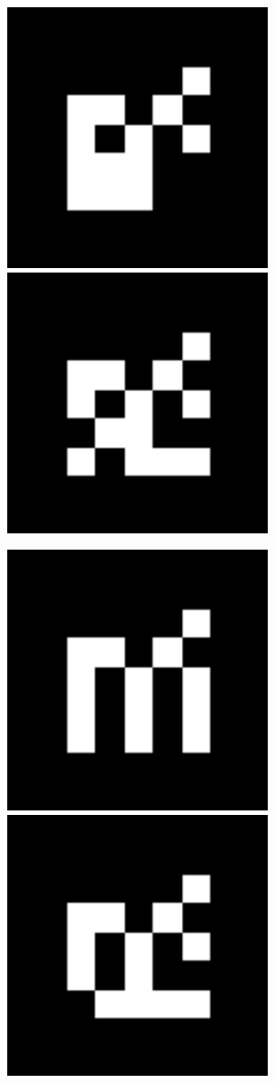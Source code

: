 \documentclass[10pt,letterpaper]{article}
\begin{document}
\includegraphics[width=3in]{MarkerData_137.png}
\includegraphics[width=3in]{MarkerData_138.png}


\includegraphics[width=3in]{MarkerData_139.png}
\includegraphics[width=3in]{MarkerData_140.png}
\end{document}

